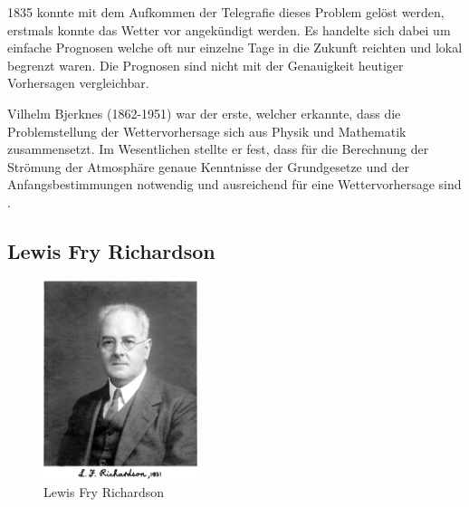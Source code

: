 \begin{refsection}
1835 konnte mit dem Aufkommen der Telegrafie dieses Problem gelöst
werden, erstmals konnte das Wetter vor angekündigt werden. Es
handelte sich dabei um einfache Prognosen welche oft nur einzelne
Tage in die Zukunft reichten und lokal begrenzt waren. Die Prognosen
sind nicht mit der Genauigkeit heutiger Vorhersagen vergleichbar.

Vilhelm Bjerknes
%
(1862-1951) war der erste, welcher erkannte, dass die Problemstellung
der Wettervorhersage sich aus Physik und Mathematik zusammensetzt.
Im Wesentlichen stellte er fest, dass für die Berechnung der Strömung
der Atmosphäre genaue Kenntnisse der Grundgesetze und der
Anfangsbestimmungen notwendig und ausreichend für eine Wettervorhersage
sind \cite{klima:stocker}.

\subsection{Lewis Fry Richardson
\label{klima:subsection:richardson}}
%

\begin{figure}
\centering
\includegraphics[width=0.4\textwidth]{klima/richardson.jpg}
\caption{Lewis Fry Richardson \cite{klima:biography}
\label{klima:geschichte:richardson}}
\end{figure}


\end{refsection}
